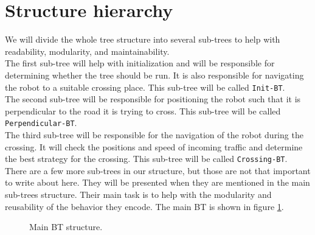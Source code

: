 \section{Structure hierarchy}
    We will divide the whole tree structure into several sub-trees to help with readability, modularity, and maintainability.\\
    The first sub-tree will help with initialization and will be responsible for determining whether the tree should be run. It is also responsible for navigating the robot to a suitable crossing place. This sub-tree will be called \texttt{Init-BT}.\\
    The second sub-tree will be responsible for positioning the robot such that it is perpendicular to the road it is trying to cross. This sub-tree will be called \texttt{Perpendicular-BT}.\\
    The third sub-tree will be responsible for the navigation of the robot during the crossing. It will check the positions and speed of incoming traffic and determine the best strategy for the crossing. This sub-tree will be called \texttt{Crossing-BT}.\\
    There are a few more sub-trees in our structure, but those are not that important to write about here. They will be presented when they are mentioned in the main sub-trees structure. Their main task is to help with the modularity and reusability of the behavior they encode.
    The main BT is shown in figure \ref{fig:main-BT}.
    \begin{figure}[ht]
        \caption{Main BT structure.}
        \label{fig:main-BT}
    \end{figure}

